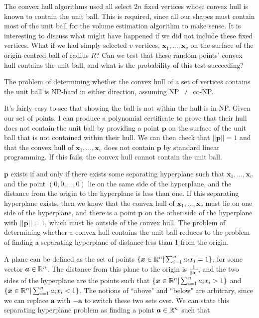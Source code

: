 The convex hull algorithms used all select $2n$ fixed vertices whose convex hull is known to contain the unit ball. This is required, since all our shapes must contain most of the unit ball for the volume estimation algorithm to make sense. It is interesting to discuss what might have happened if we did not include these fixed vertices. What if we had simply selected $v$ vertices, ${\bm x}_1, ..., {\bm x}_v$ on the surface of the origin-centred ball of radius $R$? Can we test that these random points' convex hull contains the unit ball, and what is the probability of this test succeeding?

\begin{proposition}
The problem of determining whether the convex hull of a set of vertices contains the unit ball is NP-hard in either direction, assuming NP $\neq$ co-NP.
\end{proposition}

It's fairly easy to see that showing the ball is not within the hull is in NP. Given our set of points, I can produce a polynomial certificate to prove that their hull does not contain the unit ball by providing a point $\bm p$ on the surface of the unit ball that is not contained within their hull. We can then check that $||{\bm p}|| = 1$ and that the convex hull of ${\bm x}_1, ..., {\bm x}_v$ does not contain $\bm p$ by standard linear programming. If this fails, the convex hull cannot contain the unit ball.

$\bm p$ exists if and only if there exists some separating hyperplane such that ${\bm x}_1, ..., {\bm x}_v$ and the point $(0,0,...,0)$ lie on the same side of the hyperplane, and the distance from the origin to the hyperplane is less than one. If this separating hyperplane exists, then we know that the convex hull of ${\bm x}_1, ..., {\bm x}_v$ must lie on  one side of the hyperplane, and there is a point $\bm p$ on the other side of the hyperplane with $||{\bm p}|| = 1$, which must lie outside of the convex hull. The problem of determining whether a convex hull contains the unit ball reduces to the problem of finding a separating hyperplane of distance less than 1 from the origin.

A plane can be defined as the set of points $\{ {\bm x} \in \mathbb{R} ^n | \sum^n_{i=1} a_i x_i = 1\}$, for some vector ${\bm a} \in \mathbb{R} ^n$. The distance from this plane to the origin is $\frac{1}{||{\bm a}||}$, and the two sides of the hyperplane are the points such that $\{ {\bm x} \in \mathbb{R} ^n | \sum^n_{i=1} a_i x_i > 1 \}$ and $\{ {\bm x} \in \mathbb{R} ^n | \sum^n_{i=1} a_i x_i < 1 \}$. The notions of ``above" and ``below" are arbitrary, since we can replace $\bm a$ with $- \bm a$ to switch these two sets over. We can state this separating hyperplane problem as finding a point ${\bm a} \in \mathbb{R}^n$ such that

